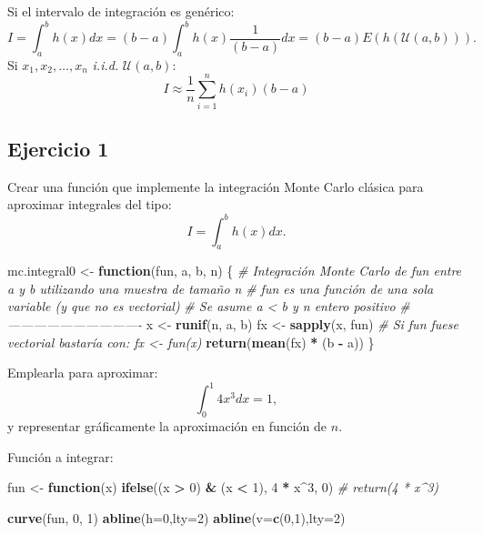 \documentclass[]{book}
\newenvironment{Shaded}{\begin{snugshade}}{\end{snugshade}}
\newcommand{\KeywordTok}[1]{\textcolor[rgb]{0.13,0.29,0.53}{\textbf{#1}}}
\newcommand{\DataTypeTok}[1]{\textcolor[rgb]{0.13,0.29,0.53}{#1}}
\newcommand{\DecValTok}[1]{\textcolor[rgb]{0.00,0.00,0.81}{#1}}
\newcommand{\StringTok}[1]{\textcolor[rgb]{0.31,0.60,0.02}{#1}}
\newcommand{\CommentTok}[1]{\textcolor[rgb]{0.56,0.35,0.01}{\textit{#1}}}
\newcommand{\ControlFlowTok}[1]{\textcolor[rgb]{0.13,0.29,0.53}{\textbf{#1}}}
\newcommand{\OperatorTok}[1]{\textcolor[rgb]{0.81,0.36,0.00}{\textbf{#1}}}
\newcommand{\NormalTok}[1]{#1}
\theoremstyle{definition}
\theoremstyle{definition}
\theoremstyle{definition}
\theoremstyle{remark}
\begin{document}
Si el intervalo de integración es genérico:
\[I = \int_{a}^{b}h\left( x\right) dx = 
(b-a)\int_{a}^{b}h\left( x\right) \frac{1}{(b-a)}dx = 
(b-a)E\left( h\left( \mathcal{U}\left( a, b \right) \right) \right).\]
Si \(x_{1},x_{2},\ldots ,x_{n}\) \emph{i.i.d.}
\(\mathcal{U}\left( a, b\right)\):
\[I\approx \frac{1}{n}\sum\limits_{i=1}^{n}h\left( x_{i}\right) (b-a)\]

\subsection{Ejercicio 1}\label{ejercicio-1}

Crear una función que implemente la integración Monte Carlo clásica para
aproximar integrales del tipo: \[I=\int_{a}^{b}h\left(  x\right)  dx.\]

\begin{Shaded}
\begin{Highlighting}[]
\NormalTok{mc.integral0 <-}\StringTok{ }\ControlFlowTok{function}\NormalTok{(fun, a, b, n) \{}
  \CommentTok{# Integración Monte Carlo de fun entre a y b utilizando una muestra de tamaño n}
  \CommentTok{# fun es una función de una sola variable (y que no es vectorial)}
  \CommentTok{# Se asume a < b y n entero positivo}
  \CommentTok{# -------------------------------}
\NormalTok{  x <-}\StringTok{ }\KeywordTok{runif}\NormalTok{(n, a, b)}
\NormalTok{  fx <-}\StringTok{ }\KeywordTok{sapply}\NormalTok{(x, fun) }\CommentTok{# Si fun fuese vectorial bastaría con: fx <- fun(x)}
  \KeywordTok{return}\NormalTok{(}\KeywordTok{mean}\NormalTok{(fx) }\OperatorTok{*}\StringTok{ }\NormalTok{(b }\OperatorTok{-}\StringTok{ }\NormalTok{a))}
\NormalTok{\}}
\end{Highlighting}
\end{Shaded}

Emplearla para aproximar: \[\int_{0}^{1}4x^{3}dx=1,\] y representar
gráficamente la aproximación en función de \(n\).

Función a integrar:

\begin{Shaded}
\begin{Highlighting}[]
\NormalTok{fun <-}\StringTok{ }\ControlFlowTok{function}\NormalTok{(x) }\KeywordTok{ifelse}\NormalTok{((x }\OperatorTok{>}\StringTok{ }\DecValTok{0}\NormalTok{) }\OperatorTok{&}\StringTok{ }\NormalTok{(x }\OperatorTok{<}\StringTok{ }\DecValTok{1}\NormalTok{), }\DecValTok{4} \OperatorTok{*}\StringTok{ }\NormalTok{x}\OperatorTok{^}\DecValTok{3}\NormalTok{, }\DecValTok{0}\NormalTok{)}
\CommentTok{# return(4 * x^3)}

\KeywordTok{curve}\NormalTok{(fun, }\DecValTok{0}\NormalTok{, }\DecValTok{1}\NormalTok{)}
\KeywordTok{abline}\NormalTok{(}\DataTypeTok{h=}\DecValTok{0}\NormalTok{,}\DataTypeTok{lty=}\DecValTok{2}\NormalTok{)}
\KeywordTok{abline}\NormalTok{(}\DataTypeTok{v=}\KeywordTok{c}\NormalTok{(}\DecValTok{0}\NormalTok{,}\DecValTok{1}\NormalTok{),}\DataTypeTok{lty=}\DecValTok{2}\NormalTok{)}
\end{Highlighting}
\end{Shaded}
\end{document}
